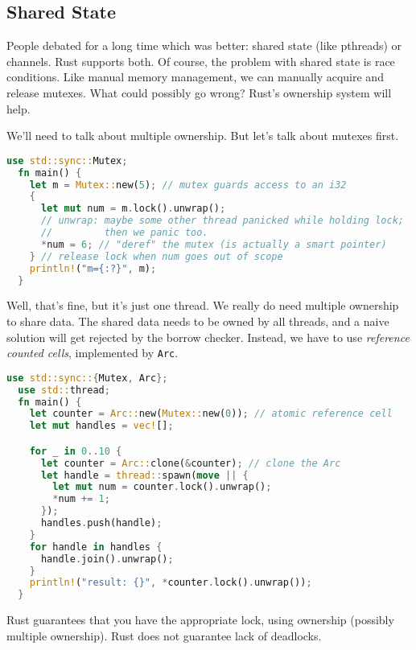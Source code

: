 \subsection*{Shared State}
People debated for a long time which was better: shared state (like pthreads) or channels.
Rust supports both. Of course, the problem with shared state is race conditions.
Like manual memory management, we can manually acquire and release mutexes. What could
possibly go wrong? Rust's ownership system will help.

We'll need to talk about multiple ownership. But let's talk about mutexes first.
\begin{lstlisting}[language=Rust]
  use std::sync::Mutex;
  fn main() {
    let m = Mutex::new(5); // mutex guards access to an i32
    {
      let mut num = m.lock().unwrap();
      // unwrap: maybe some other thread panicked while holding lock;
      //         then we panic too.
      *num = 6; // "deref" the mutex (is actually a smart pointer)
    } // release lock when num goes out of scope
    println!("m={:?}", m);
  }
\end{lstlisting}
Well, that's fine, but it's just one thread. We really do need multiple ownership
to share data. The shared data needs to be owned by all threads, and a naive solution
will get rejected by the borrow checker. Instead, we have to use \emph{reference counted
  cells}, implemented by {\tt Arc}.
\begin{lstlisting}[language=Rust]
  use std::sync::{Mutex, Arc};
  use std::thread;
  fn main() {
    let counter = Arc::new(Mutex::new(0)); // atomic reference cell
    let mut handles = vec![];

    for _ in 0..10 {
      let counter = Arc::clone(&counter); // clone the Arc
      let handle = thread::spawn(move || {
        let mut num = counter.lock().unwrap();
        *num += 1;
      });
      handles.push(handle);
    }
    for handle in handles {
      handle.join().unwrap();
    }
    println!("result: {}", *counter.lock().unwrap());
  }
\end{lstlisting}
Rust guarantees that you have the appropriate lock, using ownership (possibly multiple ownership).
Rust does not guarantee lack of deadlocks.





